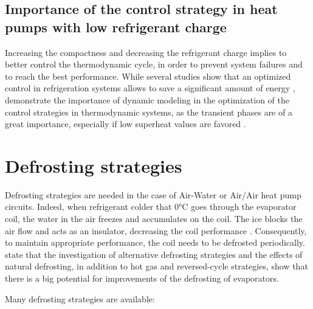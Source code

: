 \subsection{Importance of the control strategy in heat pumps with low
  refrigerant charge}
\label{sec:sota-control}

Increasing the compactness and decreasing the refrigerant charge
implies to better control the thermodynamic cycle, in order to prevent
system failures and to reach the best performance. While several
studies show that an optimized control in refrigeration systems allows
to save a significant amount of energy
\citep{jakobsen-rasmussen-1998a,abdelghaniidrissi-richalet-2001a,yao-zhou-2004a,leducq-trystram-2006a},
\citet{Fallahsohi-LinShi-2010a} demonstrate the importance of dynamic
modeling in the optimization of the control strategies in
thermodynamic systems, as the transient phases are of a great
importance, especially if low superheat values are favored
\citep{TamainotTelto-1993a,TamainotTelto-Lallemand-1996a,lin-yeh-2007a,nanayakkara-uehara-2002a}.

\section{Defrosting strategies}
\label{sec:defrosting-art}

Defrosting strategies are needed in the case of Air-Water or Air/Air
heat pump circuits. Indeed, when refrigerant colder that 0°C goes
through the evaporator coil, the water in the air freezes and
accumulates on the coil. The ice blocks the air flow and acts as an
insulator, decreasing the coil performance
\citep[p.\,169]{dincer-kanoglu-2010a}. Consequently, to maintain
appropriate performance, the coil needs to be defrosted
periodically. \citet[p.\,4]{bertsch-hubacher-2002a} state that the
investigation of alternative defrosting strategies and the effects of
natural defrosting, in addition to hot gas and reversed-cycle
strategies, show that there is a big potential for improvements of
the defrosting of evaporators.

Many defrosting strategies are available:

